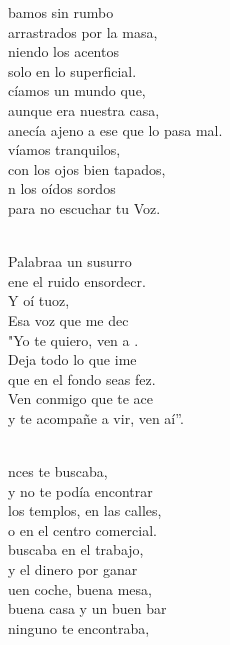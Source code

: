\documentclass[12pt]{article}
\begin{document}
\begin{multicols*}{2}
\begin{cancion}%
	bamos sin rumbo  \\
arrastrados por la masa,\\
	niendo los acentos \\
solo en lo superficial.\\
	cíamos un mundo que, \\
aunque era nuestra casa,\\
	anecía ajeno a ese que lo pasa mal.\\
	víamos tranquilos, \\
con los ojos bien tapados,\\
	n los oídos sordos \\
para no escuchar tu Voz.\\\jump\\
	\begin{chorus}%
	 Palabraa un susurro \\
	ene el ruido ensordecr.\\
	Y oí tuoz,\\
	Esa voz que me dec \\
	"Yo te quiero, ven a . \\
	Deja todo lo que ime \\
	que en el fondo seas fez.\\
	Ven conmigo que te ace \\
	y te acompañe a vir, ven aí”.\\
	\end{chorus}%
	\jump\\
	nces te buscaba, \\
y no te podía encontrar\\
	 los templos, en las calles, \\
o en el centro comercial.\\
	 buscaba en el trabajo, \\
y el dinero por ganar\\
	uen coche, buena mesa, \\
buena casa y un buen bar\\
	 ninguno te encontraba, \\

\end{cancion}
\end{multicols*}
\end{document}

